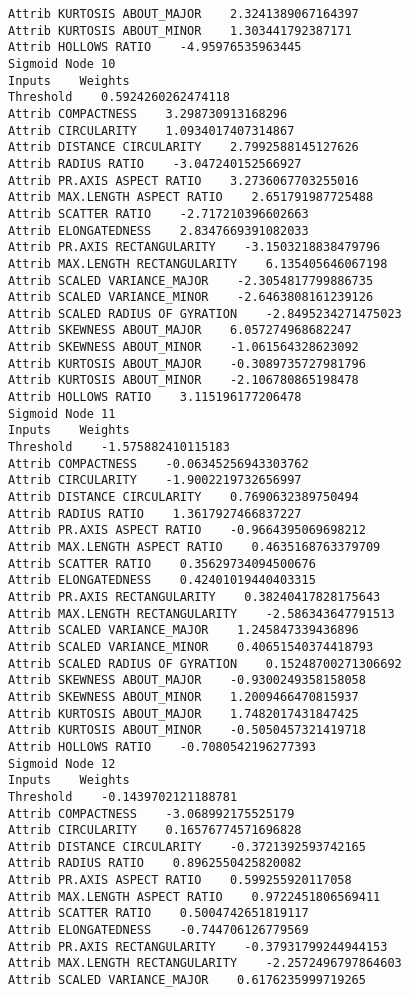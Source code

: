 \documentclass[
	article,			%
	11pt,				%
	oneside,			%
	a4paper,			%
	english,			%
	brazil,				%
	sumario=tradicional
	]{abntex2}
\begin{document}
\begin{lstlisting}
Attrib KURTOSIS ABOUT_MAJOR    2.3241389067164397
Attrib KURTOSIS ABOUT_MINOR    1.303441792387171
Attrib HOLLOWS RATIO    -4.95976535963445
Sigmoid Node 10
Inputs    Weights
Threshold    0.5924260262474118
Attrib COMPACTNESS    3.298730913168296
Attrib CIRCULARITY    1.0934017407314867
Attrib DISTANCE CIRCULARITY    2.7992588145127626
Attrib RADIUS RATIO    -3.047240152566927
Attrib PR.AXIS ASPECT RATIO    3.2736067703255016
Attrib MAX.LENGTH ASPECT RATIO    2.651791987725488
Attrib SCATTER RATIO    -2.717210396602663
Attrib ELONGATEDNESS    2.8347669391082033
Attrib PR.AXIS RECTANGULARITY    -3.1503218838479796
Attrib MAX.LENGTH RECTANGULARITY    6.135405646067198
Attrib SCALED VARIANCE_MAJOR    -2.3054817799886735
Attrib SCALED VARIANCE_MINOR    -2.6463808161239126
Attrib SCALED RADIUS OF GYRATION    -2.8495234271475023
Attrib SKEWNESS ABOUT_MAJOR    6.057274968682247
Attrib SKEWNESS ABOUT_MINOR    -1.061564328623092
Attrib KURTOSIS ABOUT_MAJOR    -0.3089735727981796
Attrib KURTOSIS ABOUT_MINOR    -2.106780865198478
Attrib HOLLOWS RATIO    3.115196177206478
Sigmoid Node 11
Inputs    Weights
Threshold    -1.575882410115183
Attrib COMPACTNESS    -0.06345256943303762
Attrib CIRCULARITY    -1.9002219732656997
Attrib DISTANCE CIRCULARITY    0.7690632389750494
Attrib RADIUS RATIO    1.3617927466837227
Attrib PR.AXIS ASPECT RATIO    -0.9664395069698212
Attrib MAX.LENGTH ASPECT RATIO    0.4635168763379709
Attrib SCATTER RATIO    0.35629734094500676
Attrib ELONGATEDNESS    0.42401019440403315
Attrib PR.AXIS RECTANGULARITY    0.38240417828175643
Attrib MAX.LENGTH RECTANGULARITY    -2.586343647791513
Attrib SCALED VARIANCE_MAJOR    1.245847339436896
Attrib SCALED VARIANCE_MINOR    0.40651540374418793
Attrib SCALED RADIUS OF GYRATION    0.15248700271306692
Attrib SKEWNESS ABOUT_MAJOR    -0.9300249358158058
Attrib SKEWNESS ABOUT_MINOR    1.2009466470815937
Attrib KURTOSIS ABOUT_MAJOR    1.7482017431847425
Attrib KURTOSIS ABOUT_MINOR    -0.5050457321419718
Attrib HOLLOWS RATIO    -0.7080542196277393
Sigmoid Node 12
Inputs    Weights
Threshold    -0.1439702121188781
Attrib COMPACTNESS    -3.068992175525179
Attrib CIRCULARITY    0.16576774571696828
Attrib DISTANCE CIRCULARITY    -0.3721392593742165
Attrib RADIUS RATIO    0.8962550425820082
Attrib PR.AXIS ASPECT RATIO    0.599255920117058
Attrib MAX.LENGTH ASPECT RATIO    0.9722451806569411
Attrib SCATTER RATIO    0.5004742651819117
Attrib ELONGATEDNESS    -0.744706126779569
Attrib PR.AXIS RECTANGULARITY    -0.37931799244944153
Attrib MAX.LENGTH RECTANGULARITY    -2.2572496797864603
Attrib SCALED VARIANCE_MAJOR    0.6176235999719265

\end{lstlisting}
\end{document}
